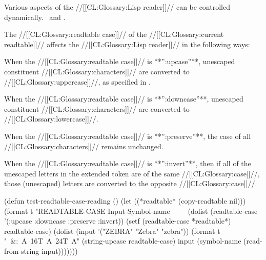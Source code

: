 


Various aspects of the //[[CL:Glossary:Lisp reader]]// can be controlled dynamically.
\Seesection\Readtables\ and \secref\ReaderVars.

\endsubsection%
 

The //[[CL:Glossary:readtable case]]// of the //[[CL:Glossary:current readtable]]// affects the //[[CL:Glossary:Lisp reader]]//
in the following ways:

\beginlist
{}

 When the //[[CL:Glossary:readtable case]]// is **'':upcase''**,
 unescaped constituent //[[CL:Glossary:characters]]// are converted to //[[CL:Glossary:uppercase]]//,
 as specified in \secref\ReaderAlgorithm.


 When the //[[CL:Glossary:readtable case]]// is **'':downcase''**,
 unescaped constituent //[[CL:Glossary:characters]]// are converted to //[[CL:Glossary:lowercase]]//.


When the //[[CL:Glossary:readtable case]]// is **'':preserve''**,
 the case of all //[[CL:Glossary:characters]]// remains unchanged.


When the //[[CL:Glossary:readtable case]]// is **'':invert''**,
 then if all of the unescaped letters in the extended token are of the same //[[CL:Glossary:case]]//, 
 those (unescaped) letters are converted to the opposite //[[CL:Glossary:case]]//.

\endlist


\code
 (defun test-readtable-case-reading ()
   (let ((*readtable* (copy-readtable nil)))
     (format t "READTABLE-CASE  Input   Symbol-name~
              ~%
              ~%
     (dolist (readtable-case '(:upcase :downcase :preserve :invert))
       (setf (readtable-case *readtable*) readtable-case)
       (dolist (input '("ZEBRA" "Zebra" "zebra"))
         (format t "~&:~A~16T~A~24T~A"
                 (string-upcase readtable-case)
                 input
                 (symbol-name (read-from-string input)))))))
\endcode
 
